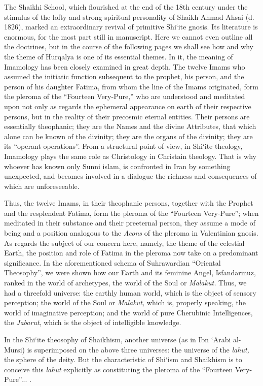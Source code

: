 \begin{quotationx}
The Shaikhi School, which flourished at the end of the 18th century under the stimulus of the lofty and strong spiritual personality of Shaikh Ahmad Ahsai (d. 1826), marked an extraordinary revival of primitive Shi`ite gnosis. Its literature is enormous, for the most part still in manuscript. Here we cannot even outline all the doctrines, but in the course of the following pages we shall see how and why the theme of Hurqalya is one of its essential themes. In it, the meaning of Imamology has been closely examined in great depth. The twelve Imams who assumed the initiatic function subsequent to the prophet, his person, and the person of his daughter Fatima, from whom the line of the Imams originated, form the pleroma of the ``Fourteen Very-Pure,'' who are understood and meditated upon not only as regards the ephemeral appearance on earth of their respective persons, but in the reality of their precosmic eternal entities. Their persons are essentially theophanic; they are the Names and the divine Attributes, that which alone can be known of the divinity; they are the organs of the divinity; they are its ``operant operations''. From a structural point of view, in Shi`ite theology, Imamology plays the same role as Christology in Christain theology. That is why whoever has known only Sunni islam, is confronted in Iran by something unexpected, and becomes involved in a dialogue the richness and consequences of which are unforeseeable.

Thus, the twelve Imams, in their theophanic persons, together with the Prophet and the resplendent Fatima, form the pleroma of the ``Fourteen Very-Pure''; when meditated in their substance and their preeternal person, they assume a mode of being and a position analogous to the \emph{Aeons} of the pleroma in Valentinian gnosis. As regards the subject of our concern here, namely, the theme of the celestial Earth, the position and role of Fatima in the pleroma now take on a predominant significance. In the aforementioned schema of Suhrawardian ``Oriental Theosophy'', we were shown how our Earth and its feminine Angel, Isfandarmuz, ranked in the world of archetypes, the world of the Soul or \emph{Malakut.} Thus, we had a threefold universe: the earthly human world, which is the object of sensory perception; the world of the Soul or \emph{Malakut,} which is, properly speaking, the world of imaginative perception; and the world of pure Cherubinic Intelligences, the \emph{Jabarut}, which is the object of intelligible knowledge.

In the Shi`ite theosophy of Shaikhism, another universe (as in Ibn `Arabi al-Mursi) is superimposed on the above three universes: the universe of the \emph{lahut,} the sphere of the deity. But the characteristic of Shi`ism and Shaikhism is to conceive this \emph{lahut} explicitly as constituting the pleroma of the ``Fourteen Very-Pure''... .


\end{quotationx}
